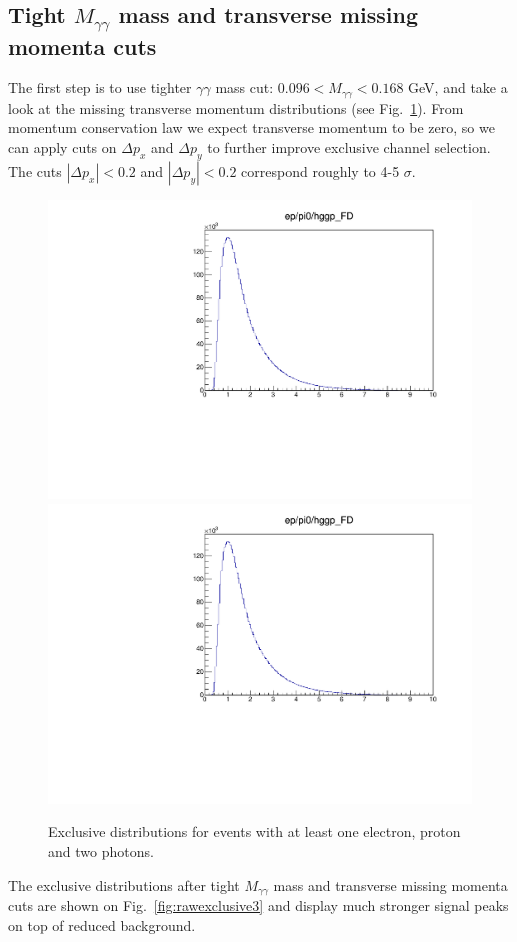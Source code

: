 \subsection{Tight $M_{\gamma\gamma}$ mass and transverse missing momenta cuts}

The first step is to use tighter $\gamma\gamma$ mass cut: $0.096<M_{\gamma\gamma}<0.168$ GeV, and take a look at the missing transverse momentum distributions (see Fig.~\ref{fig:ptdistributions}).
From momentum conservation law we expect transverse momentum to be zero, so we can apply cuts on $\Delta p_x$ and $\Delta p_y$ to further improve exclusive channel selection.
The cuts $|\Delta p_x|<0.2$ and $|\Delta p_y|<0.2$ correspond roughly to 4-5 $\sigma$.

\begin{figure}[hbt]
	\centering
	\includegraphics[page=24,width=0.47\linewidth]{figures/eppi0.exclusive.pdf}
	\includegraphics[page=25,width=0.47\linewidth]{figures/eppi0.exclusive.pdf}
	
	\caption{Exclusive distributions for events with at least one electron, proton and two photons.}
	\label{fig:ptdistributions}
\end{figure}

The exclusive distributions after tight $M_{\gamma\gamma}$ mass and transverse missing momenta cuts are shown on Fig.~\ref{fig:rawexclusive3} and display much stronger signal peaks on top of reduced background.


